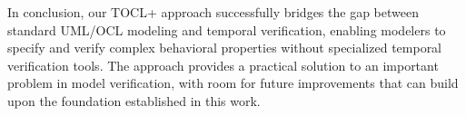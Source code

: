 In conclusion, our TOCL+ approach successfully bridges the gap between standard 
UML/OCL modeling and temporal verification, enabling modelers to specify and verify 
complex behavioral properties without specialized temporal verification tools. 
The approach provides a practical solution to an important problem in model verification, 
with room for future improvements that can build upon the foundation established in 
this work.





